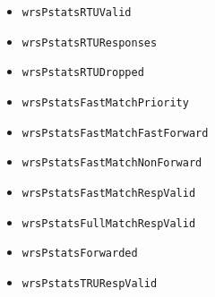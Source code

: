 \begin{itemize}
\begin{itemize}
      \item \texttt{wrsPstatsRTUValid}
      \item \texttt{wrsPstatsRTUResponses}
      \item \texttt{wrsPstatsRTUDropped}
      \item \texttt{wrsPstatsFastMatchPriority}
      \item \texttt{wrsPstatsFastMatchFastForward}
      \item \texttt{wrsPstatsFastMatchNonForward}
      \item \texttt{wrsPstatsFastMatchRespValid}
      \item \texttt{wrsPstatsFullMatchRespValid}
      \item \texttt{wrsPstatsForwarded}
      \item \texttt{wrsPstatsTRURespValid}
    \end{itemize}


\end{itemize}

